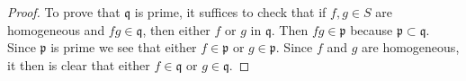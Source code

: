 \documentclass[10pt,a4paper]{amsart}
\theoremstyle{plain}
\theoremstyle{definition}
\theoremstyle{remark}
\numberwithin{equation}{subsection}
\begin{document}
\begin{proof}
To prove that $\mathfrak q$ is prime, it suffices to check that
if $f, g \in S$ are homogeneous and $fg \in \mathfrak q$, then
either $f$ or $g$ in $\mathfrak q$. Then $fg \in \mathfrak p$
because $\mathfrak p \subset \mathfrak q$. Since $\mathfrak p$
is prime we see that either $f \in \mathfrak p$ or $g \in \mathfrak p$.
Since $f$ and $g$ are homogeneous, it then is clear that either
$f \in \mathfrak q$ or $g \in \mathfrak q$.
\end{proof}
\end{document}
